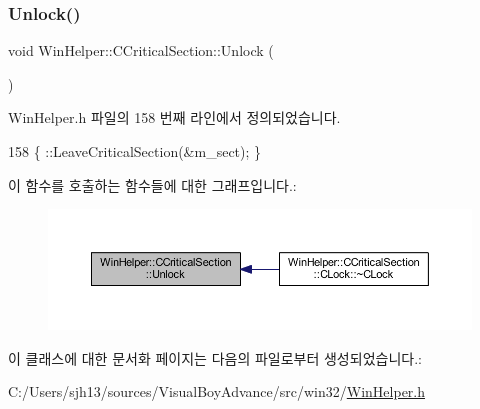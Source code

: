 \subsubsection{\texorpdfstring{Unlock()}{Unlock()}}
{\footnotesize\ttfamily void Win\+Helper\+::\+C\+Critical\+Section\+::\+Unlock (\begin{DoxyParamCaption}{ }\end{DoxyParamCaption})\hspace{0.3cm}{\ttfamily [inline]}}



Win\+Helper.\+h 파일의 158 번째 라인에서 정의되었습니다.


\begin{DoxyCode}
158 \{ ::LeaveCriticalSection(&m\_sect); \}
\end{DoxyCode}
이 함수를 호출하는 함수들에 대한 그래프입니다.\+:
\nopagebreak
\begin{figure}[H]
\begin{center}
\leavevmode
\includegraphics[width=350pt]{class_win_helper_1_1_c_critical_section_a32b6fc61701020c400f3bb9b5e00bf12_icgraph}
\end{center}
\end{figure}


이 클래스에 대한 문서화 페이지는 다음의 파일로부터 생성되었습니다.\+:\begin{DoxyCompactItemize}
\item 
C\+:/\+Users/sjh13/sources/\+Visual\+Boy\+Advance/src/win32/\mbox{\hyperlink{_win_helper_8h}{Win\+Helper.\+h}}\end{DoxyCompactItemize}
